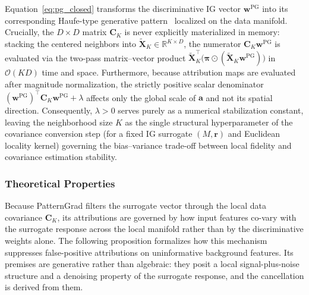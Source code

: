 \documentclass[pdflatex,sn-mathphys-num]{sn-jnl}
\theoremstyle{thmstyleone}
\theoremstyle{thmstyletwo}%
\theoremstyle{thmstylethree}%
\begin{document}
Equation~\eqref{eq:pg_closed} transforms the discriminative IG vector $\mathbf{w}^{\text{PG}}$ into its corresponding Haufe-type generative pattern~\cite{haufe2014} localized on the data manifold. Crucially, the $D \times D$ matrix $\mathbf{C}_K$ is never explicitly materialized in memory: stacking the centered neighbors into $\tilde{\mathbf{X}}_K \in \mathbb{R}^{K \times D}$, the numerator $\mathbf{C}_K \mathbf{w}^{\text{PG}}$ is evaluated via the two-pass matrix--vector product $\tilde{\mathbf{X}}_K^\top \big(\boldsymbol{\pi} \odot (\tilde{\mathbf{X}}_K \mathbf{w}^{\text{PG}})\big)$ in $\mathcal{O}(KD)$ time and space. Furthermore, because attribution maps are evaluated after magnitude normalization, the strictly positive scalar denominator $(\mathbf{w}^{\text{PG}})^\top \mathbf{C}_K \mathbf{w}^{\text{PG}} + \lambda$ affects only the global scale of $\mathbf{a}$ and not its spatial direction. Consequently, $\lambda > 0$ serves purely as a numerical stabilization constant, leaving the neighborhood size $K$ as the single structural hyperparameter of the covariance conversion step (for a fixed IG surrogate $(M, \mathbf{r})$ and Euclidean locality kernel) governing the bias--variance trade-off between local fidelity and covariance estimation stability.

\subsubsection{Theoretical Properties}
Because PatternGrad filters the surrogate vector through the local data covariance $\mathbf{C}_K$, its attributions are governed by how input features co-vary with the surrogate response across the local manifold rather than by the discriminative weights alone. The following proposition formalizes how this mechanism suppresses false-positive attributions on uninformative background features. Its premises are generative rather than algebraic: they posit a local signal-plus-noise structure and a denoising property of the surrogate response, and the cancellation is derived from them.
\end{document}
